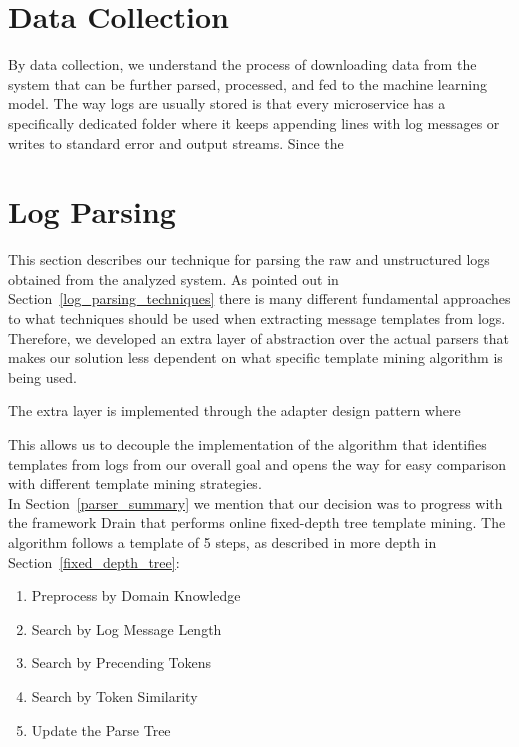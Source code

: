 \section{Data Collection}
By data collection, we understand the process of downloading data from the system that can be further parsed, processed, and fed to the machine learning model.
The way logs are usually stored is that every microservice has a specifically dedicated folder where it keeps appending lines with log messages or writes to standard error and output streams.
Since the 


\section{Log Parsing}
This section describes our technique for parsing the raw and unstructured logs obtained from the analyzed system.
As pointed out in Section~\ref{log_parsing_techniques} there is many different fundamental approaches to what techniques should be used when extracting message templates from logs. 
Therefore, we developed an extra layer of abstraction over the actual parsers that makes our solution less dependent on what specific template mining algorithm is being used.

The extra layer is implemented through the adapter design pattern where 

This allows us to decouple the implementation of the algorithm that identifies templates from logs from our overall goal and opens the way for easy comparison with different template mining strategies.\\

In Section~\ref{parser_summary} we mention that our decision was to progress with the framework Drain \cite{drain2017} that performs online fixed-depth tree template mining. The algorithm follows a template of 5 steps, as described in more depth in Section~\ref{fixed_depth_tree}:
\begin{enumerate}
    \item Preprocess by Domain Knowledge
    \item Search by Log Message Length
    \item Search by Precending Tokens
    \item Search by Token Similarity
    \item Update the Parse Tree
\end{enumerate}

